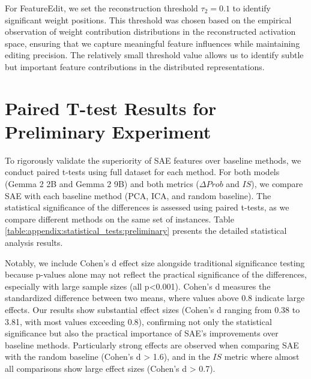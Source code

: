 For FeatureEdit, we set the reconstruction threshold $\tau_2 = 0.1$ to identify significant weight positions. This threshold was chosen based on the empirical observation of weight contribution distributions in the reconstructed activation space, ensuring that we capture meaningful feature influences while maintaining editing precision. The relatively small threshold value allows us to identify subtle but important feature contributions in the distributed representations.

\section{Paired T-test Results for Preliminary Experiment}
\label{section:appendix:Paired T-test Results for Preliminary Experiment}
To rigorously validate the superiority of SAE features over baseline methods, we conduct paired t-tests using full dataset for each method. For both models (Gemma 2 2B and Gemma 2 9B) and both metrics ($\Delta Prob$ and $IS$), we compare SAE with each baseline method (PCA, ICA, and random baseline). The statistical significance of the differences is assessed using paired t-tests, as we compare different methods on the same set of instances. Table \ref{table:appendix:statistical_tests:preliminary} presents the detailed statistical analysis results.

Notably, we include Cohen's d effect size alongside traditional significance testing because p-values alone may not reflect the practical significance of the differences, especially with large sample sizes (all p<0.001). Cohen's d measures the standardized difference between two means, where values above 0.8 indicate large effects. Our results show substantial effect sizes (Cohen's d ranging from 0.38 to 3.81, with most values exceeding 0.8), confirming not only the statistical significance but also the practical importance of SAE's improvements over baseline methods. Particularly strong effects are observed when comparing SAE with the random baseline (Cohen's d > 1.6), and in the $IS$ metric where almost all comparisons show large effect sizes (Cohen's d > 0.7).

